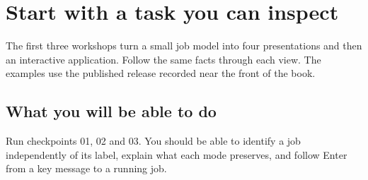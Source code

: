\chapter*{Start with a task you can inspect}

The first three workshops turn a small job model into four presentations and then an interactive application. Follow the same facts through each view. The examples use the published release recorded near the front of the book.

\section*{What you will be able to do}

Run checkpoints 01, 02 and 03. You should be able to identify a job independently of its label, explain what each mode preserves, and follow Enter from a key message to a running job.
